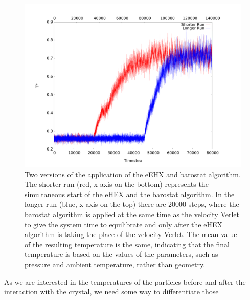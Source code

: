 \documentclass[12pt]{article}
\begin{document}
\begin{figure}[h]
    \begin{center}
        \includegraphics[scale=0.4]{images/baro_temp_compare_other.pdf}
        \caption{Two versions of the application of the eEHX and barostat algorithm. The shorter run (red, x-axis on the bottom) represents 
            the simultaneous start of the eHEX and the barostat algorithm. In the longer run (blue, x-axis on the top) there are 20000 steps, where
        the barostat algorithm is applied at the same time as the velocity Verlet to give the system time to equilibrate and only after the eHEX
    algorithm is taking the place of the velocity Verlet. The mean value of the resulting temperature is the same, indicating that the final
temperature is based on the values of the parameters, such as pressure and ambient temperature, rather than geometry.}
        \label{fig:baro1}
    \end{center}
\end{figure}
As we are interested in the temperatures of the particles before and after the interaction with the crystal, we need some way to differentiate those
\end{document}
